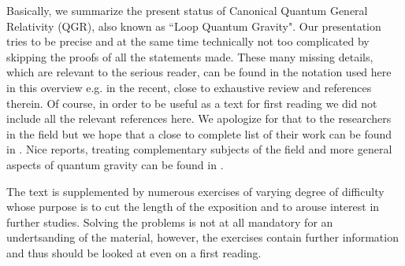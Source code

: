 \documentclass[12pt]{report}
\begin{document}
Basically, we summarize the present status of Canonical Quantum General 
Relativity (QGR), also known as ``Loop Quantum Gravity". Our presentation 
tries to be precise and
at the same time technically not too complicated by skipping the proofs 
of all the statements made. These many missing details, which are 
relevant to the serious reader, can be found in the notation used here 
in this overview e.g. in the recent, close to 
exhaustive review \cite{0} and references therein. Of course, in order 
to be useful as a text for first reading we did not include all the 
relevant references here. We apologize for that to the researchers 
in the field but we hope that a close to complete list of their work 
can be found in \cite{0}. Nice reports, treating complementary subjects 
of the field and more general aspects of quantum gravity can be found in 
\cite{0a}.

The text is supplemented by numerous exercises 
of varying degree of difficulty whose purpose is to cut the length of 
the exposition and to arouse interest in further studies. Solving the 
problems is not at all mandatory for an undertsanding of the 
material,
however, the exercises contain further information and thus should be 
looked at even on a first reading. 
\end{document}
